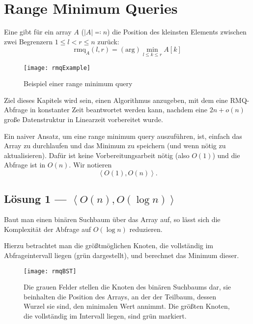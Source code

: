 \chapter{Range Minimum Queries}

Eine  gibt für ein array \( A \) (\( \left\vert A \right\vert \eqqcolon n \)) die Position des kleinsten Elements zwischen zwei Begrenzern \( 1 \leq l < r \leq n \) zurück:
\begin{equation*}
  \text{rmq}_A(l,r) = (\text{arg})\min_{l \leq k \leq r}A[k]
\end{equation*}

\begin{figure}[H]
  \texttt{[image: rmqExample]}
  \caption{Beispiel einer range minimum query}
\end{figure}

Ziel dieses Kapitels wird sein, einen Algorithmus anzugeben, mit dem eine RMQ-Abfrage in konstanter Zeit beantwortet werden kann, nachdem eine \( 2n + o(n) \) große Datenstruktur in Linearzeit vorbereitet wurde.

Ein naiver Ansatz, um eine range minimum query auszuführen, ist, einfach das Array zu durchlaufen und das Minimum zu speichern (und wenn nötig zu aktualisieren). Dafür ist keine Vorbereitungsarbeit nötig (also \( O(1) \)) und die Abfrage ist in \( O(n) \). Wir notieren
\begin{equation*}
  \left\langle O(1), O(n) \right\rangle\text{.}
\end{equation*}

\section{Lösung 1 --- \( \left\langle O(n), O(\log n) \right\rangle \)}

Baut man einen binären Suchbaum über das Array auf, so lässt sich die Komplexität der Abfrage auf \( O(\log n) \) reduzieren.

Hierzu betrachtet man die größtmöglichen Knoten, die vollständig im Abfrageintervall liegen (grün dargestellt), und berechnet das Minimum dieser.

\begin{figure}[H]
  \texttt{[image: rmqBST]}
  \captionsetup{width=.7\textwidth}
  \caption{Die grauen Felder stellen die Knoten des binären Suchbaums dar, sie beinhalten die Position des Arrays, an der der Teilbaum, dessen Wurzel sie sind, den minimalen Wert annimmt. Die größten Knoten, die vollständig im Intervall liegen, sind grün markiert.}
\end{figure}

